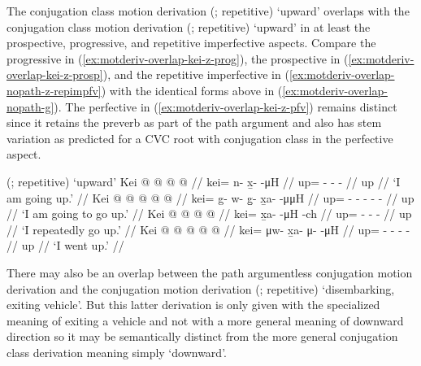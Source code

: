 \documentclass[12pt,letterpaper,oneside,article]{memoir}
\begin{document}
The  conjugation class motion derivation  (;  repetitive) ‘upward’ overlaps with the  conjugation class motion derivation  (;  repetitive) ‘upward’ in at least the prospective, progressive, and repetitive imperfective aspects.
Compare the progressive in (\ref{ex:motderiv-overlap-kei-z-prog}), the prospective in (\ref{ex:motderiv-overlap-kei-z-prosp}), and the repetitive imperfective in (\ref{ex:motderiv-overlap-nopath-z-repimpfv}) with the identical forms above in (\ref{ex:motderiv-overlap-nopath-g}).
The perfective in (\ref{ex:motderiv-overlap-kei-z-pfv}) remains distinct since it retains the  preverb as part of the path argument and also has  stem variation as predicted for a CVC root with  conjugation class in the perfective aspect.


\pex\label{ex:motderiv-overlap-kei-z}%
\a\label{ex:motderiv-overlap-kei-z-motderiv}%
%
	 (;  repetitive) ‘upward’
\a\label{ex:motderiv-overlap-kei-z-prog}%
%
\begingl
	\gla	Kei @  @ {} @ {} @ {} //
	\glb	kei= n- x̱-  -μH //
	\glc	up= - -  - //
	\gld	up\•  {} {} {} //
	\glft	‘I am going up.’
		//
\endgl
\a\label{ex:motderiv-overlap-kei-z-prosp}%
%
\begingl
	\gla	Kei  @ {} @ {} @ {} @ {} @ {} //
	\glb	kei= g- w- g̱- x̱a-  -μμH //
	\glc	up= - - - -  - //
	\gld	up\•  {} {} {} {} {} //
	\glft	‘I am going to go up.’
		//
\endgl
\a\label{ex:motderiv-overlap-nopath-z-repimpfv}%
%
\begingl
	\gla	Kei @  @ {} @ {} @ {} //
	\glb	kei= x̱a-  -μH -ch //
	\glc	up= -  - - //
	\gld	up\•  {} {} {} //
	\glft	‘I repeatedly go up.’
		//
\endgl
\a\label{ex:motderiv-overlap-kei-z-pfv}%
%
\begingl
	\gla	Kei @  @ {} @ {} @ {} @ {} //
	\glb	kei= μw- x̱a- μ-  -μH //
	\glc	up= - - -  - //
	\gld	up  {} {} {} {} //
	\glft	‘I went up.’
		//
\endgl
\xe

There may also be an overlap between the path argumentless  conjugation motion derivation and the  conjugation motion derivation  (;  repetitive) ‘disembarking, exiting vehicle’.
But this latter derivation is only given with the specialized meaning of exiting a vehicle and not with a more general meaning of downward direction \parencite[297]{leer:1991} so it may be semantically distinct from the more general  conjugation class derivation meaning simply ‘downward’.
\end{document}
